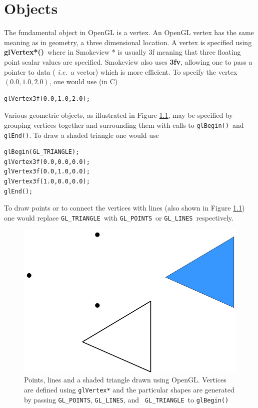 \documentclass[11pt,twoside]{book}
\begin{document}
\chapter{Objects} The fundamental object in OpenGL is a vertex.
An OpenGL vertex has the same meaning as in geometry, a three
dimensional location. A vertex is specified using {\bf
glVertex*()}\ where in Smokeview * is usually 3f meaning that
three floating point scalar values are specified. Smokeview also
uses {\bf 3fv}, allowing one to pass a pointer to data ({\em
i.e.}\ a vector) which is more efficient. To specify the vertex
$(0.0,1.0,2.0)$, one would use (in C)
\begin{verbatim}
glVertex3f(0.0,1.0,2.0);
\end{verbatim}
Various geometric objects, as illustrated in Figure
\ref{figshapes}, may be specified by grouping vertices together
and surrounding them with calls to {\tt glBegin()}\ and {\tt
glEnd()}. To draw a shaded triangle one would use
\begin{verbatim}
glBegin(GL_TRIANGLE);
glVertex3f(0.0,0.0,0.0);
glVertex3f(0.0,1.0,0.0);
glVertex3f(1.0,0.0,0.0);
glEnd();
\end{verbatim}
To draw points or to connect the vertices with lines (also shown
in Figure \ref{figshapes}) one would replace {\tt GL\_TRIANGLE}\
with {\tt GL\_POINTS}\ or {\tt GL\_LINES}\ respectively.
\begin{figure}[t]
\begin{center}
\includegraphics[width=6.0in]{figures/shapes}
\end{center}
\caption[Points, lines and a shaded triangle drawn using OpenGL.]
{Points, lines and a shaded triangle drawn using OpenGL. Vertices
are defined using {\tt glVertex*} and the particular shapes are
generated by passing {\tt GL\_POINTS}, {\tt GL\_LINES}, and {\tt
GL\_TRIANGLE}\ to {\tt glBegin()} } \label{figshapes}
\end{figure}
\end{document}
